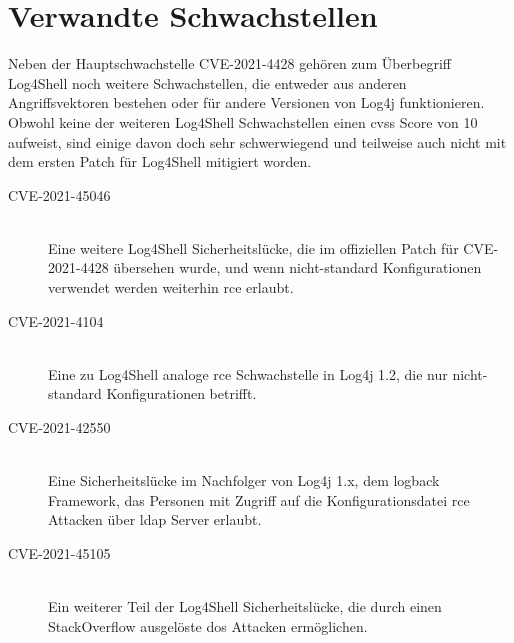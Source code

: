 
\section{Verwandte Schwachstellen}\label{sec:similarCVEs}
Neben der Hauptschwachstelle CVE-2021-4428 gehören zum Überbegriff Log4Shell noch weitere Schwachstellen, die entweder aus anderen Angriffsvektoren bestehen oder für andere Versionen von Log4j funktionieren.
Obwohl keine der weiteren Log4Shell Schwachstellen einen \gls{cvss} Score von 10 aufweist, sind einige davon doch sehr schwerwiegend und teilweise auch nicht mit dem ersten Patch für Log4Shell mitigiert worden.

\begin{description}
    \item[CVE-2021-45046]\hfill \\Eine weitere Log4Shell Sicherheitslücke, die im offiziellen Patch für CVE-2021-4428 übersehen wurde, und wenn nicht-standard Konfigurationen verwendet werden weiterhin \gls{rce} erlaubt.
    \item[CVE-2021-4104]\hfill \\Eine zu Log4Shell analoge \gls{rce} Schwachstelle in Log4j 1.2, die nur nicht-standard Konfigurationen betrifft.
    \item[CVE-2021-42550]\hfill \\Eine Sicherheitslücke im Nachfolger von Log4j 1.x, dem logback Framework, das Personen mit Zugriff auf die Konfigurationsdatei \gls{rce} Attacken über \gls{ldap} Server erlaubt.
    \item[CVE-2021-45105]\hfill \\Ein weiterer Teil der Log4Shell Sicherheitslücke, die durch einen StackOverflow ausgelöste \gls{dos} Attacken ermöglichen.
\end{description}
